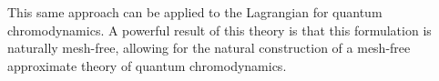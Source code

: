 \documentclass[book.tex]{subfiles}
\begin{document}
This same approach can be applied to the Lagrangian for quantum chromodynamics. A powerful result of this theory is that this formulation is naturally mesh-free, allowing for the natural construction of a mesh-free approximate theory of quantum chromodynamics.







\end{document}
